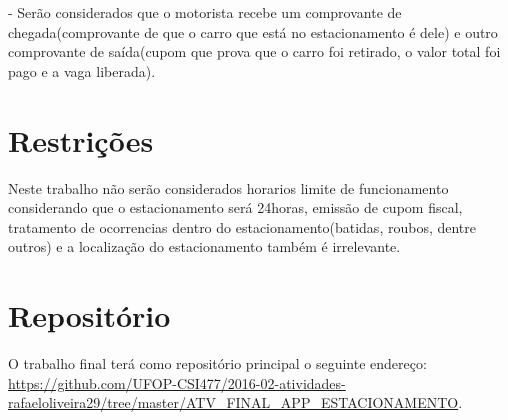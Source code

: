 \documentclass[10pt,a4paper,article]{abntex2}
\begin{document}
- Serão considerados que o motorista recebe um comprovante de chegada(comprovante de que o carro que está no estacionamento é dele) e outro comprovante de saída(cupom que prova que o carro foi retirado, o valor total foi pago e a vaga liberada).


	\section{Restrições}

		Neste trabalho não serão considerados horarios limite de funcionamento considerando que o estacionamento será 24horas, emissão de cupom fiscal, tratamento de ocorrencias dentro do estacionamento(batidas, roubos, dentre outros) e a localização do estacionamento também é irrelevante.

	\section{Repositório}

		O trabalho final terá como repositório principal o seguinte endereço: \url{https://github.com/UFOP-CSI477/2016-02-atividades-rafaeloliveira29/tree/master/ATV_FINAL_APP_ESTACIONAMENTO}.

\end{document}
